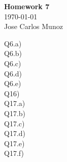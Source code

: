 \documentclass[12pt,english]{article}
\begin{document}
\begin{center}
    \Large
    \textbf{Homework 7}\\
    \small
    \today\\
    \large
    Jose Carlos Munoz
\end{center}%
Q6.a)\\
Q6.b)\\
Q6.c)\\
Q6.d)\\
Q6.e)\\
Q16)\\
Q17.a)\\
Q17.b)\\
Q17.c)\\
Q17.d)\\
Q17.e)\\
Q17.f)\\
\end{document}
